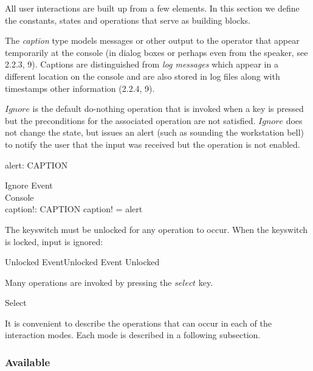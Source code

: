 All user interactions are built up from a few elements. In this
section we define the constants, states and operations that serve as
building blocks.

The {\em caption} type models messages or other output to the operator
that appear temporarily at the console (in dialog boxes or perhaps
even from the speaker, see 2.2.3, 9).  Captions are distinguished from
{\em log messages} which appear in a different location on the console
and are also stored in log files along with timestamps other
information (2.2.4, 9).

\begin{zed}\end{zed}
$Ignore$ is the default do-nothing operation that is
invoked when a key is pressed but the preconditions for the associated
operation are not satisfied.  $Ignore$ does not change the state, but
issues an alert (such as sounding the workstation bell) to notify the
user that the input was received but the operation is not enabled.  

\begin{axdef} alert: CAPTION \end{axdef}

\begin{schema}{Ignore}
	Event \\
	\Xi Console \\
	caption!: CAPTION
\where
	caption! = alert
\end{schema}
The keyswitch must be unlocked for any operation to occur.  When the keyswitch is
locked, input is ignored:

\begin{zed}	
	Unlocked 
\also
	EventUnlocked  Event \land Unlocked
\end{zed}
Many operations are invoked by pressing the $select$ key.

\begin{zed} 
	Select 
\end{zed}
It is convenient to describe the operations that can occur in each of
the interaction modes.  Each mode is described in a following
subsection.

\subsubsection{Available}

